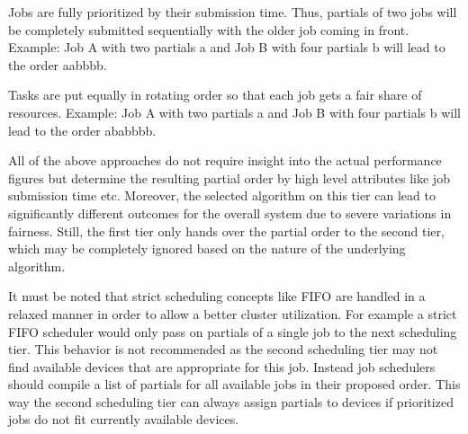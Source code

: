 \begin{description}[style=nextline]
	\item[First-In First-Out (abbr. FIFO)] 
	Jobs are fully prioritized by their submission time. Thus, partials of two jobs will be completely submitted sequentially with the older job coming in front. Example: Job A with two partials a and Job B with four partials b will lead to the order aabbbb.
	\item[Round-Robin] 
	Tasks are put equally in rotating order so that each job gets a fair share of resources. Example: Job A with two partials a and Job B with four partials b will lead to the order ababbbb.
\end{description}

All of the above approaches do not require insight into the actual performance figures but determine the resulting partial order by high level attributes like job submission time etc. Moreover, the selected algorithm on this tier can lead to significantly different outcomes for the overall system due to severe variations in fairness. Still, the first tier only hands over the partial order to the second tier, which may be completely ignored based on the nature of the underlying algorithm.

It must be noted that strict scheduling concepts like FIFO are handled in a relaxed manner in order to allow a better cluster utilization. For example a strict FIFO scheduler would only pass on partials of a single job to the next scheduling tier. This behavior is not recommended as the second scheduling tier may not find available devices that are appropriate for this job. Instead job schedulers should compile a list of partials for all available jobs in their proposed order. This way the second scheduling tier can always assign partials to devices if prioritized jobs do not fit currently available devices.

